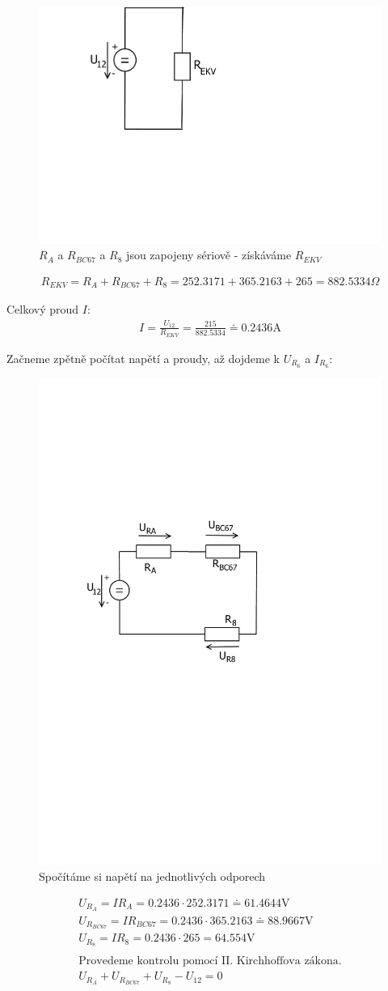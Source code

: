 	\begin{figure}[H]
		\center\includegraphics[width=0.3\linewidth]{obr/1_7}
		\caption{$R_A$ a $R_{BC67}$ a $R_8$ jsou zapojeny sériově - získáváme $R_{EKV}$}
	\end{figure}
	\begin{gather*}
		R_{EKV} = R_{A} + R_{BC67} + R_8 = 252.3171 + 365.2163 + 265 = 882.5334 \Omega
	\end{gather*}

	Celkový proud $I$:
	\begin{gather*}
		I = \frac{U_{12}}{R_{EKV}} = \frac{215}{882.5334} \doteq 0.2436 \text{A}
	\end{gather*}

	Začneme zpětně počítat napětí a proudy, až dojdeme k $U_{R_6}$ a $I_{R_6}$:

	\begin{figure}[H]
		\center\includegraphics[width=0.6\linewidth]{obr/1_8}
		\caption{Spočítáme si napětí na jednotlivých odporech}
	\end{figure}
	\begin{gather*}
		U_{R_A} = {I R_A} = {0.2436\cdot 252.3171} \doteq 61.4644 \text{V} \\
		U_{R_{BC67}} = {I R_{BC67}} = {0.2436 \cdot 365.2163} \doteq 88.9667  \text{V} \\
		U_{R_8} = {I R_8} = {0.2436 \cdot 265} = 64.554  \text{V} \\
		\\
		\text{Provedeme kontrolu pomocí II. Kirchhoffova zákona.}  \\
		U_{R_A} + U_{R_{BC67}} + U_{R_8} - U_{12} =  0 \\
	\end{gather*}

